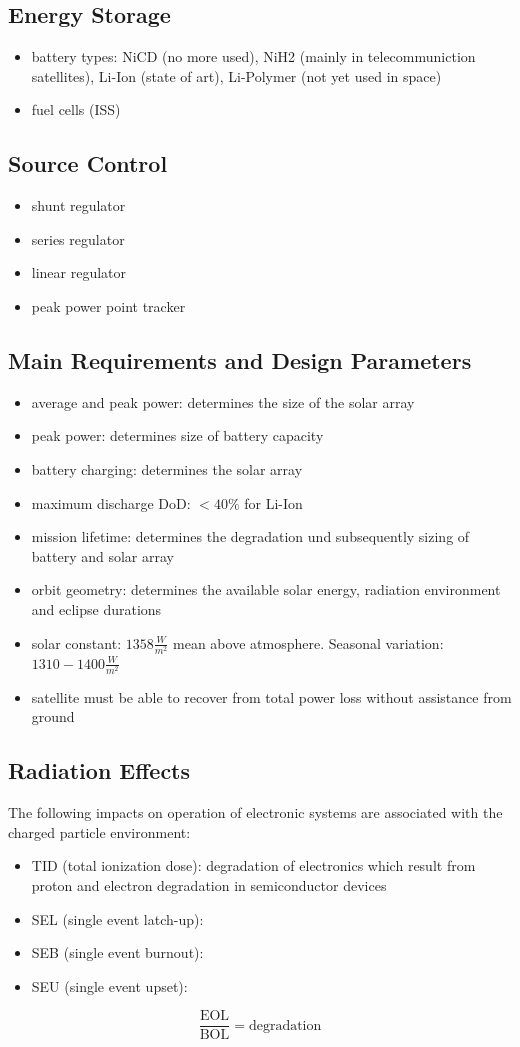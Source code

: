 \subsection{Energy Storage}
 \begin{itemize}
  \item battery types: NiCD (no more used), NiH2 (mainly in telecommuniction satellites), Li-Ion (state of art), Li-Polymer (not yet used in space)
  \item fuel cells (ISS)
 \end{itemize}
\subsection{Source Control}
\begin{itemize}
 \item shunt regulator
 \item series regulator
 \item linear regulator
 \item peak power point tracker
\end{itemize}
\subsection{Main Requirements and Design Parameters}
\begin{itemize}
 \item average and peak power: determines the size of the solar array
 \item peak power: determines size of battery capacity
 \item battery charging: determines the solar array
 \item maximum discharge DoD: $< 40\%$ for Li-Ion
 \item mission lifetime: determines the degradation und subsequently sizing of battery and solar array
 \item orbit geometry: determines the available solar energy, radiation environment and eclipse durations
 \item solar constant: $1358 \frac{W}{m^2}$ mean above atmosphere. Seasonal variation: $1310-1400 \frac{W}{m^2}$
 \item satellite must be able to recover from total power loss without assistance from ground 
\end{itemize}
\subsection{Radiation Effects}
The following impacts on operation of electronic systems are associated with the charged particle environment:
\begin{itemize}
 \item TID (total ionization dose): degradation of electronics which result from proton and electron degradation in semiconductor devices
 \item SEL (single event latch-up): 
 \item SEB (single event burnout): 
 \item SEU (single event upset): 
\end{itemize}
\[\frac{\text{EOL}}{\text{BOL}} = \text{degradation}\]
